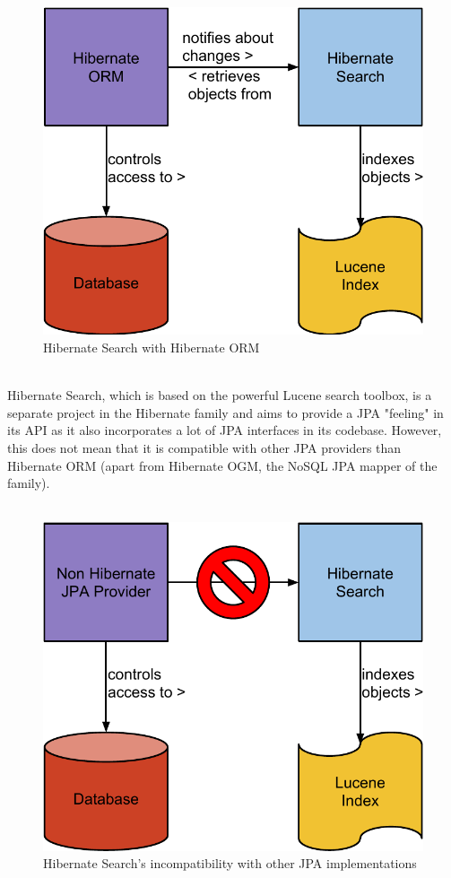 \begin{figure}[ht]
	\centering
	\includegraphics[scale=0.45]{images/hibernate_search_hibernate_schema.pdf}
	\caption{Hibernate Search with Hibernate ORM}
	\label{fig1}
\end{figure}
\pagebreak
\\
Hibernate Search, which is based on the powerful Lucene search toolbox, is a separate project in the Hibernate family and aims to provide a JPA "feeling" in its API as it also incorporates a lot of JPA interfaces in its codebase. However, this does not mean that it is compatible with other JPA providers than Hibernate ORM (apart from Hibernate OGM, the NoSQL JPA mapper of the family).
\\\\
\begin{figure}[ht]
	\centering
	\includegraphics[scale=0.45]{images/hibernate_search_any_jpa_problem_schema.pdf}
	\caption{Hibernate Search's incompatibility with other JPA implementations}
	\label{fig2}
\end{figure}
